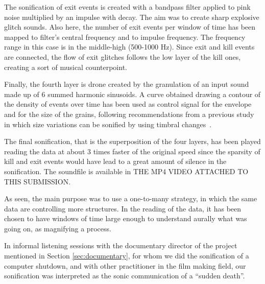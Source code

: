 \documentclass[manuscript,screen]{acmart}
\begin{document}
The sonification of exit events is created with a bandpass filter applied to pink noise multiplied by an impulse with decay. The aim was to create sharp explosive glitch sounds.
Also here, the number of exit events per window of time has been mapped to filter's central frequency and to impulse frequency. The frequency range in this case is in the middle-high (500-1000 Hz). Since exit and kill events are connected, the flow of exit glitches follows the low layer of the kill ones, creating a sort of musical counterpoint.

Finally, the fourth layer is drone created by the granulation of an input sound made up of 6 summed harmonic sinusoids. A curve obtained drawing a contour of the density of events over time has been used as control signal for the envelope and for the size of the grains, following recommendations from a previous study in which size variations can be sonified by using timbral changes~\cite{dubus2013systematic}. 

The final sonification, that is the superposition of the four layers, has been played reading the data at about 3 times faster of the original speed since the sparsity of kill and exit events would have lead to a great amount of silence in the sonification. The soundfile is available in THE MP4 VIDEO ATTACHED TO THIS SUBMISSION.  

As seen, the main purpose was to use a one-to-many strategy, in which the same data are controlling more structures. In the reading of the data, it has been chosen to have windows of time large enough to understand aurally what was going on, as magnifying a process.

In informal listening sessions with the documentary director of the project mentioned in Section \ref{sec:documentary}, for whom we did the sonification of a computer shutdown, and with other practitioner in the film making field, our sonification was interpreted as the sonic communication of a ``sudden death''.
\end{document}
